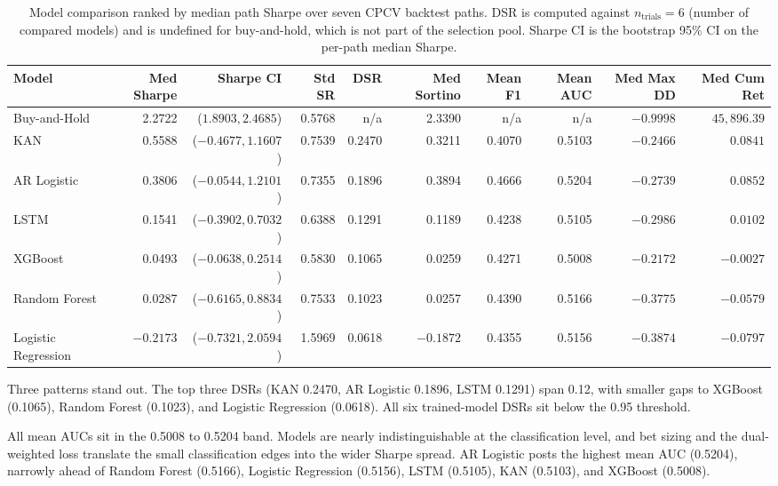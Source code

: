 \documentclass[12pt,a4paper,oneside]{article}
\begin{document}
\begin{table}[H]
\centering
\footnotesize
\begin{tabular}{lrrrrrrrrr}
\toprule
Model & Med Sharpe & Sharpe CI & Std SR & DSR & Med Sortino & Mean F1 & Mean AUC & Med Max DD & Med Cum Ret \\
\midrule
Buy-and-Hold        &  2.2722 & ($1.8903, 2.4685$)   & 0.5768 & n/a    &  2.3390 & n/a    & n/a    & $-0.9998$ & $45{,}896.39$ \\
KAN                 &  0.5588 & ($-0.4677, 1.1607$)  & 0.7539 & 0.2470 &  0.3211 & 0.4070 & 0.5103 & $-0.2466$ & $0.0841$ \\
AR Logistic         &  0.3806 & ($-0.0544, 1.2101$)  & 0.7355 & 0.1896 &  0.3894 & 0.4666 & 0.5204 & $-0.2739$ & $0.0852$ \\
LSTM                &  0.1541 & ($-0.3902, 0.7032$)  & 0.6388 & 0.1291 &  0.1189 & 0.4238 & 0.5105 & $-0.2986$ & $0.0102$ \\
XGBoost             &  0.0493 & ($-0.0638, 0.2514$)  & 0.5830 & 0.1065 &  0.0259 & 0.4271 & 0.5008 & $-0.2172$ & $-0.0027$ \\
Random Forest       &  0.0287 & ($-0.6165, 0.8834$)  & 0.7533 & 0.1023 &  0.0257 & 0.4390 & 0.5166 & $-0.3775$ & $-0.0579$ \\
Logistic Regression & $-0.2173$ & ($-0.7321, 2.0594$)  & 1.5969 & 0.0618 & $-0.1872$ & 0.4355 & 0.5156 & $-0.3874$ & $-0.0797$ \\
\bottomrule
\end{tabular}
\caption{Model comparison ranked by median path Sharpe over seven CPCV backtest paths. DSR is computed against $n_{\text{trials}} = 6$ (number of compared models) and is undefined for buy-and-hold, which is not part of the selection pool. Sharpe CI is the bootstrap 95\% CI on the per-path median Sharpe.}
\label{tab:model_comparison}
\end{table}

Three patterns stand out. The top three DSRs (KAN 0.2470, AR Logistic 0.1896, LSTM 0.1291) span 0.12, with smaller gaps to XGBoost (0.1065), Random Forest (0.1023), and Logistic Regression (0.0618). All six trained-model DSRs sit below the 0.95 threshold.

All mean AUCs sit in the 0.5008 to 0.5204 band. Models are nearly indistinguishable at the classification level, and bet sizing and the dual-weighted loss translate the small classification edges into the wider Sharpe spread. AR Logistic posts the highest mean AUC (0.5204), narrowly ahead of Random Forest (0.5166), Logistic Regression (0.5156), LSTM (0.5105), KAN (0.5103), and XGBoost (0.5008).
\end{document}

